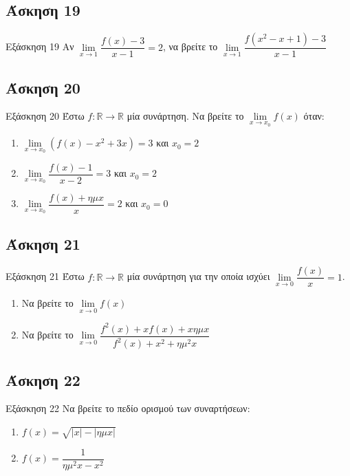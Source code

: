 \documentclass[greek]{beamer}
\begin{document}
\subsection{Άσκηση 19}
\begin{frame}[label=Άσκηση19,t]{Εξάσκηση 19}
  Αν $\lim\limits_{x \to 1}{ \dfrac{f(x)-3}{x-1} }=2$, να βρείτε το $\lim\limits_{x \to 1}{ \dfrac{f(x^2-x+1)-3}{x-1} }$

\end{frame}

\subsection{Άσκηση 20}
\begin{frame}[label=Άσκηση20,t]{Εξάσκηση 20}
  Έστω $f:\mathbb{R}\to\mathbb{R}$ μία συνάρτηση. Να βρείτε το $\lim\limits_{x \to x_0}{ f(x) }$ όταν:
  \begin{enumerate}
    \item $\lim\limits_{x \to x_0}{\left(f(x)-x^2+3x  \right)=3  }$ και $x_0=2$ \pause
    \item $\lim\limits_{x \to x_0}{\dfrac{f(x)-1}{x-2}=3  }$ και $x_0=2$ \pause
    \item $\lim\limits_{x \to x_0}{\dfrac{f(x)+ημx}{x}=2  }$ και $x_0=0$
  \end{enumerate}

\end{frame}

\subsection{Άσκηση 21}
\begin{frame}[label=Άσκηση21 ,t]{Εξάσκηση 21}
  Έστω $f:\mathbb{R}\to\mathbb{R}$ μία συνάρτηση για την οποία ισχύει $\lim\limits_{x \to 0}{ \dfrac{f(x)}{x} }=1$.
  \begin{enumerate}
    \item Να βρείτε το $\lim\limits_{x \to 0}{f(x)}$ \pause
    \item Να βρείτε το $\lim\limits_{x \to 0}{\dfrac{f^2(x)+xf(x)+xημx}{f^2(x)+x^2+ημ^2x}}$
  \end{enumerate}

\end{frame}

\subsection{Άσκηση 22}
\begin{frame}[label=Άσκηση22,t]{Εξάσκηση 22}
  Να βρείτε το πεδίο ορισμού των συναρτήσεων:
  \begin{enumerate}
    \item $f(x)=\sqrt{|x|-|ημx|}$ \pause
    \item $f(x)=\dfrac{1}{ημ^2x-x^2}$
  \end{enumerate}

\end{frame}
\end{document}
